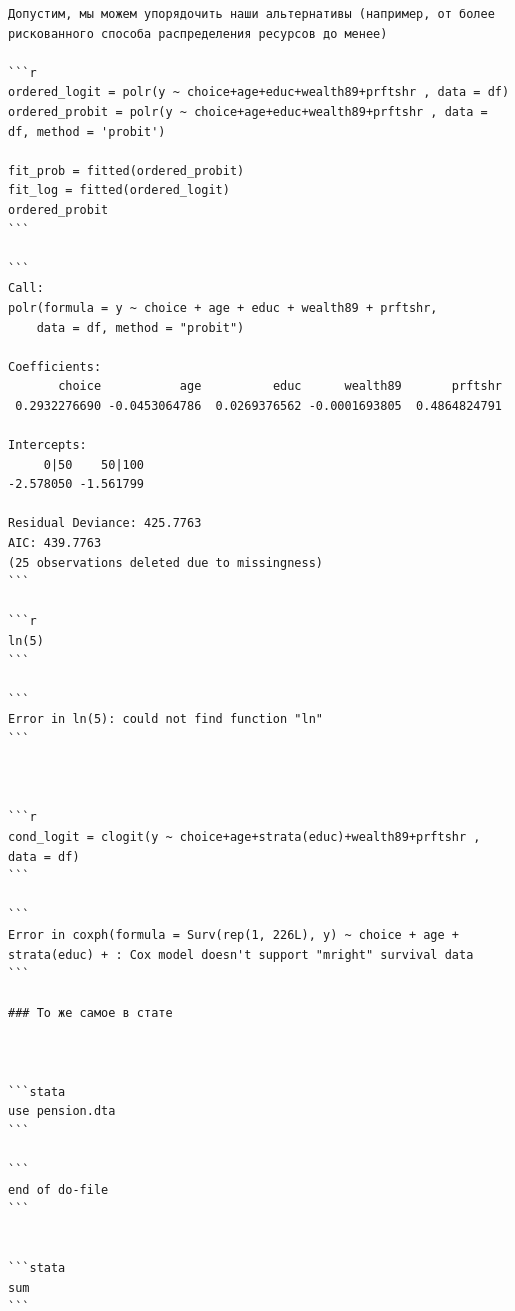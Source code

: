 \documentclass[]{book}
\begin{document}
\begin{verbatim}
Допустим, мы можем упорядочить наши альтернативы (например, от более рискованного способа распределения ресурсов до менее)

```r
ordered_logit = polr(y ~ choice+age+educ+wealth89+prftshr , data = df)
ordered_probit = polr(y ~ choice+age+educ+wealth89+prftshr , data = df, method = 'probit') 

fit_prob = fitted(ordered_probit)
fit_log = fitted(ordered_logit)
ordered_probit
```

```
Call:
polr(formula = y ~ choice + age + educ + wealth89 + prftshr, 
    data = df, method = "probit")

Coefficients:
       choice           age          educ      wealth89       prftshr 
 0.2932276690 -0.0453064786  0.0269376562 -0.0001693805  0.4864824791 

Intercepts:
     0|50    50|100 
-2.578050 -1.561799 

Residual Deviance: 425.7763 
AIC: 439.7763 
(25 observations deleted due to missingness)
```

```r
ln(5)
```

```
Error in ln(5): could not find function "ln"
```



```r
cond_logit = clogit(y ~ choice+age+strata(educ)+wealth89+prftshr , data = df)
```

```
Error in coxph(formula = Surv(rep(1, 226L), y) ~ choice + age + strata(educ) + : Cox model doesn't support "mright" survival data
```

### То же самое в стате



```stata
use pension.dta
```

```
end of do-file
```


```stata
sum
```


\end{verbatim}
\end{document}
